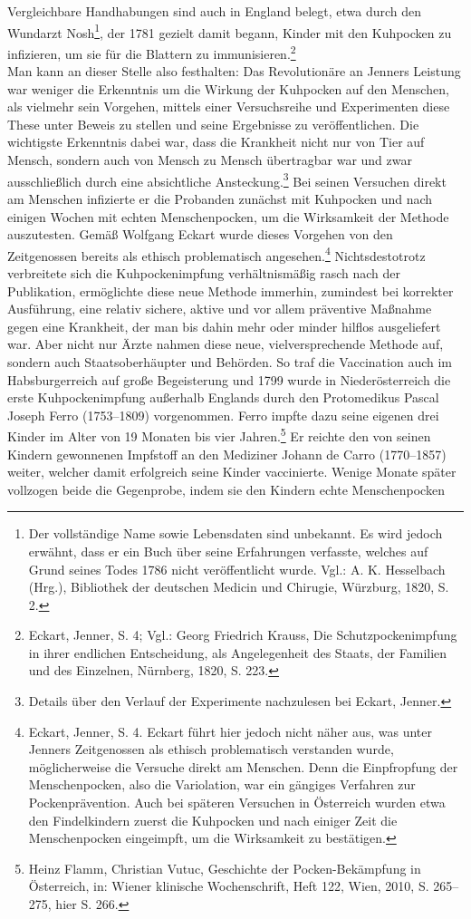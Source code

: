 \documentclass[
    a4paper,
    12pt,
    hyphens,
    chapterprefix=true,
    headheight=33pt,
    footheight=29pt,
    headings=optiontohead, %
]{scrartcl}
\begin{document}
\pagebreak
Vergleichbare Handhabungen sind auch in England belegt, etwa durch den Wundarzt Nosh\footnote{Der vollständige Name sowie Lebensdaten sind unbekannt. Es wird jedoch erwähnt, dass er ein Buch über seine Erfahrungen verfasste, welches auf Grund seines Todes 1786 nicht veröffentlicht wurde. Vgl.: A. K. Hesselbach (Hrg.), Bibliothek der deutschen Medicin und Chirugie, Würzburg, 1820, S. 2.}, der 1781 gezielt damit begann, Kinder mit den Kuhpocken zu infizieren, um sie für die Blattern zu immunisieren.\footnote{Eckart, Jenner, S. 4; Vgl.: Georg Friedrich Krauss, Die Schutzpockenimpfung in ihrer endlichen Entscheidung, als Angelegenheit des Staats, der Familien und des Einzelnen, Nürnberg, 1820, S. 223.} \\
Man kann an dieser Stelle also festhalten: Das Revolutionäre an Jenners Leistung war weniger die Erkenntnis um die Wirkung der Kuhpocken auf den Menschen, als vielmehr sein Vorgehen, mittels einer Versuchsreihe und Experimenten diese These unter Beweis zu stellen und seine Ergebnisse zu veröffentlichen. Die wichtigste Erkenntnis dabei war, dass die Krankheit nicht nur von Tier auf Mensch, sondern auch von Mensch zu Mensch übertragbar war und zwar ausschließlich durch eine absichtliche Ansteckung.\footnote{Details über den Verlauf der Experimente nachzulesen bei Eckart, Jenner.} Bei seinen Versuchen direkt am Menschen infizierte er die Probanden zunächst mit Kuhpocken und nach einigen Wochen mit echten Menschenpocken, um die Wirksamkeit der Methode auszutesten. Gemäß Wolfgang Eckart wurde dieses Vorgehen von den Zeitgenossen bereits als ethisch problematisch angesehen.\footnote{Eckart, Jenner, S. 4. Eckart führt hier jedoch nicht näher aus, was unter Jenners Zeitgenossen als ethisch problematisch verstanden wurde, möglicherweise die Versuche direkt am Menschen. Denn die Einpfropfung der Menschenpocken, also die Variolation, war ein gängiges Verfahren zur Pockenprävention. Auch bei späteren Versuchen in Österreich wurden etwa den Findelkindern zuerst die Kuhpocken und nach einiger Zeit die Menschenpocken eingeimpft, um die Wirksamkeit zu bestätigen.} Nichtsdestotrotz verbreitete sich die Kuhpockenimpfung verhältnismäßig rasch nach der Publikation, ermöglichte diese neue Methode immerhin, zumindest bei korrekter Ausführung, eine relativ sichere, aktive und vor allem präventive Maßnahme gegen eine Krankheit, der man bis dahin mehr oder minder hilflos ausgeliefert war. Aber nicht nur Ärzte nahmen diese neue, vielversprechende Methode auf, sondern auch Staatsoberhäupter und Behörden. So traf die Vaccination auch im Habsburgerreich auf große Begeisterung und 1799 wurde in Niederösterreich die erste Kuhpockenimpfung außerhalb Englands durch den Protomedikus Pascal Joseph Ferro (1753--1809) vorgenommen. Ferro impfte dazu seine eigenen drei Kinder im Alter von 19 Monaten bis vier Jahren.\footnote{Heinz Flamm, Christian Vutuc, Geschichte der Pocken-Bekämpfung in Österreich, in: Wiener klinische Wochenschrift, Heft 122, Wien, 2010, S. 265--275, hier S. 266.} Er reichte den von seinen Kindern gewonnenen Impfstoff an den Mediziner Johann de Carro (1770--1857) weiter, welcher damit erfolgreich seine Kinder vaccinierte. Wenige Monate später vollzogen beide die Gegenprobe, indem sie den Kindern echte Menschenpocken 
\end{document}
